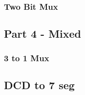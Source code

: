 \documentclass[11pt]{article}
\begin{document}
\begin{preview}
\subsubsection*{Two Bit Mux}
\begin{center}  
  \fbox{}
  \vspace*{42px}
\end{center}

\subsection*{Part 4 - Mixed}
\subsubsection*{3 to 1 Mux}
\begin{center}
  \fbox{}
  \vspace*{32px}
\end{center}

\subsection*{DCD to 7 seg}
\begin{center}  
  \fbox{}
  \vspace*{42px}
\end{center}
  
  
\end{preview}
\end{document}
